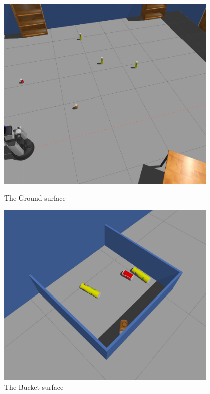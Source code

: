 \documentclass[main.tex]{subfiles}
\begin{document}
\begin{figure}
\begin{minipage}{0.48\textwidth}
        \label{fig:kn_ro_cl}
    \end{minipage}\\
    ~\\
    \begin{minipage}{0.45\textwidth}
        \centering
        \includegraphics[width=0.95\textwidth]{pictures/knowledge/ground}
        \caption{The Ground surface}
        
    \end{minipage}\hfill
    \begin{minipage}{0.48\textwidth}
        \centering
        \includegraphics[width=0.95\textwidth]{pictures/knowledge/bucket}
        \caption{The Bucket surface}
        \label{fig:kn_last_surface}
    \end{minipage}
\end{figure}
\end{document}
